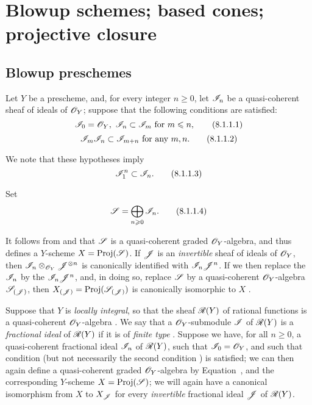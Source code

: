 \section{Blowup schemes; based cones; projective closure}
\label{section:II.8}

\subsection{Blowup preschemes}
\label{subsection:II.8.1}

\begin{env}[8.1.1]
\label{II.8.1.1}
Let $Y$ be a prescheme, and, for every integer $n\geq 0$, let $\mathscr{I}_n$ be a quasi-coherent sheaf of ideals of $\mathscr{O}_Y$; suppose that the following conditions are satisfied:
\[
\label{II.8.1.1.1}
  \mathscr{I}_0=\mathscr{O}_Y,\ \mathscr{I}_n\subset\mathscr{I}_m\text{ for }m\leqslant n,
\tag{8.1.1.1}
\]
\[
\label{II.8.1.1.2}
  \mathscr{I}_m\mathscr{I}_n\subset\mathscr{I}_{m+n}\text{ for any }m,n.
\tag{8.1.1.2}
\]

We note that these hypotheses imply
\[
\label{II.8.1.1.3}
  \mathscr{I}_1^n\subset\mathscr{I}_n.
\tag{8.1.1.3}
\]

Set
\[
\label{II.8.1.1.4}
  \mathscr{S}=\bigoplus_{n\geqslant 0}\mathscr{I}_n.
\tag{8.1.1.4}
\]

It follows from  and  that $\mathscr{S}$ is a quasi-coherent graded $\mathscr{O}_Y$-algebra, and thus defines a $Y$-scheme $X=\operatorname{Proj}(\mathscr{S})$.
If $\mathscr{J}$ is an \emph{invertible} sheaf of ideals of $\mathscr{O}_Y$, then $\mathscr{I}_n\otimes_{\mathscr{O}_Y}\mathscr{J}^{\otimes n}$ is canonically identified with $\mathscr{I}_n\mathscr{J}^n$.
If we then replace the $\mathscr{I}_n$ by the $\mathscr{I}_n\mathscr{J}^n$, and, in doing so, replace $\mathscr{S}$ by a quasi-coherent $\mathscr{O}_Y$-algebra $\mathscr{S}_{(\mathscr{J})}$, then $X_{(\mathscr{J})}=\operatorname{Proj}(\mathscr{S}_{(\mathscr{J})})$ is canonically isomorphic to $X$ .
\end{env}

\begin{env}[8.1.2]
\label{II.8.1.2}
Suppose that $Y$ is \emph{locally integral}, so that the sheaf $\mathscr{R}(Y)$ of rational functions is a quasi-coherent $\mathscr{O}_Y$-algebra .
We say that a $\mathscr{O}_Y$-submodule $\mathscr{I}$ of $\mathscr{R}(Y)$ is a \emph{fractional ideal} of $\mathscr{R}(Y)$ if it is of \emph{finite type} .
Suppose we have, for all $n\geq0$, a quasi-coherent fractional ideal $\mathscr{I}_n$ of $\mathscr{R}(Y)$, such that $\mathscr{I}_0 = \mathscr{O}_Y$, and such that condition  (but not necessarily the second condition ) is satisfied;
we can then again define a quasi-coherent graded $\mathscr{O}_Y$-algebra by Equation~, and the corresponding $Y$-scheme $X = \operatorname{Proj}(\mathscr{S})$;
we will again have a canonical isomorphism from $X$ to $X_{{\mathscr{J}}}$ for every \emph{invertible} fractional ideal $\mathscr{J}$ of $\mathscr{R}(Y)$.
\end{env}

